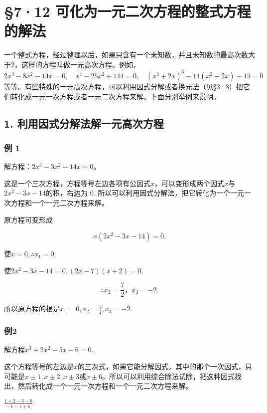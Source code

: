 \section{§7·12 可化为一元二次方程的整式方程的解法}

一个整式方程，经过整理以后，如果只含有一个未知数，并且未知数的最高次数大于2，这样的方程叫做一元高次方程。例如，\(2x^{3}-8x^{2}-14x=0,\quad x^{4}-25x^{2}+144=0,\quad(x^{3}+2x)^{3}-14(x^{2}+2x)-15=0\)等等。有些特殊的一元高次方程，可以利用因式分解或者换元法（见§3·8）把它们转化成一元一次方程或者一元二次方程来解。下面分别举例来说明。

\subsection{1. 利用因式分解法解一元高次方程}

\subsubsection{例 1}

解方程：\(2x^{3}-3x^{2}-14x=0\)。

这是一个三次方程，方程等号左边各项有公因式\(x\)，可以变形成两个因式\(x\)与\(2x^{2} - 3x - 14\)的积，右边为
0.
所以可以利用因式分解法，把它转化为一个一元一次方程和一个一元二次方程来解。

 原方程可变形成

\[
x (2 x ^ {2} - 3 x - 14) = 0.
\]

使\(x = 0, \therefore x_{1} = 0;\)

使\(2x^{2} - 3x - 14 = 0, (2x - 7)(x + 2) = 0,\)

\[
\therefore x _ {2} = \frac{7}{2}\text{，} x _ {3} = - 2.
\]

所以原方程的根是\(x_{1} = 0, x_{2} = \frac{7}{2}, x_{3} = -2.\)

\subsubsection{例2}

解方程\(x^{3} + 2x^{2} - 5x - 6 = 0.\)

这个方程等号的左边是\(x\)的三次式，如果它能分解因式，其中的那个一次因式，只可能是\(x \pm 1, x \pm 2, x \pm 3\)或\(x \pm 6\)。所以可以利用综合除法试除，把这种因式找出，然后转化成一个一元一次方程和一个一元二次方程来解。

 \(\frac{1 + 2 - 5 - 6}{-1 - 1 + 6}\)

